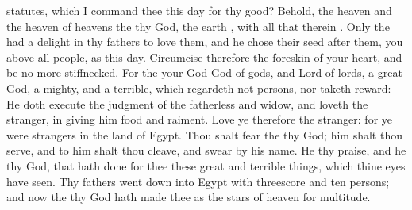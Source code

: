 {statutes, which I
command thee this
day for thy
good?
Behold, the
heaven and the
heaven of
heavens
{} the
{} thy
God, the
earth
{}, with all that therein
{}.
Only the
{} had a
delight in thy
fathers to
love them, and he
chose their
seed
after them,
{} you above all
people, as
{} this
day.
Circumcise therefore the
foreskin of your
heart, and be no more
stiffnecked.
For the
{} your
God
{}
God of
gods, and
Lord of
lords, a
great
God, a
mighty, and a
terrible, which
regardeth not
persons, nor
taketh
reward:
He doth
execute the
judgment of the
fatherless and
widow, and
loveth the
stranger, in
giving him
food and
raiment.
Love ye therefore the
stranger: for ye were
strangers in the
land of
Egypt.
Thou shalt
fear the
{} thy
God; him shalt thou
serve, and to him shalt thou
cleave, and
swear by his
name.
He
{} thy
praise, and he
{} thy
God, that hath
done for thee these
great and terrible
things, which thine
eyes have
seen.
Thy
fathers went
down into
Egypt with threescore and
ten
persons; and now the
{} thy
God hath
made thee as the
stars of
heaven for
multitude.

}
